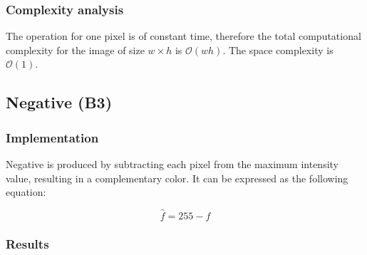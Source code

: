 \documentclass[12pt]{article}
\theoremstyle{definition}
\begin{document}
\subsubsection{Complexity analysis}

The operation for one pixel is of constant time,
therefore the total computational complexity for the image of size $w \times h$ is $\mathcal{O}(wh)$.
The space complexity is $\mathcal{O}(1)$.

\vspace{5em}
\pagebreak[3]
\subsection{Negative (B3)}

\subsubsection{Implementation}

Negative is produced by subtracting each pixel from the maximum intensity value, resulting in a complementary color.
It can be expressed as the following equation:

\begin{equation}
    \hat{f} = 255 - f
\end{equation}

\subsubsection{Results}
\end{document}
